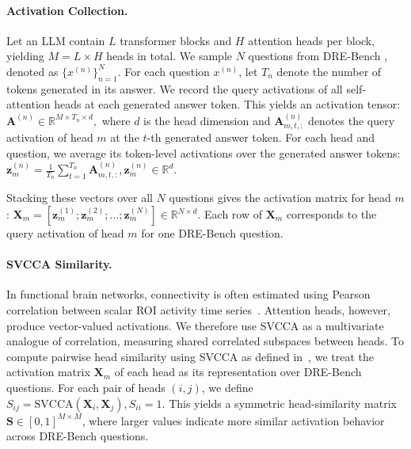 \paragraph{Activation Collection.}

Let an LLM contain $L$ transformer blocks and $H$ attention heads per block, yielding $M=L\times H$ heads in total. We sample $N$ questions from DRE-Bench \cite{yang2025truly}, denoted as $\{x^{(n)}\}_{n=1}^{N}$. For each question $x^{(n)}$, let $T_n$ denote the number of tokens generated in its answer. We record the query activations of all self-attention heads at each generated answer token.
This yields an activation tensor:
$
\mathbf{A}^{(n)} \in \mathbb{R}^{M \times T_n \times d},
$
where $d$ is the head dimension and $\mathbf{A}^{(n)}_{m,t,:}$ denotes the query activation of head $m$ at the $t$-th generated answer token. For each head and question, we average its token-level activations over the generated answer tokens:
$
\mathbf{z}^{(n)}_m =
\frac{1}{T_n}\sum_{t=1}^{T_n}\mathbf{A}^{(n)}_{m,t,:}, \mathbf{z}^{(n)}_m \in \mathbb{R}^{d}.
$

Stacking these vectors over all $N$ questions gives the activation matrix for head $m$:
$
\mathbf{X}_m =
\left[
\mathbf{z}^{(1)}_m;
\mathbf{z}^{(2)}_m;
\dots;
\mathbf{z}^{(N)}_m
\right]
\in \mathbb{R}^{N\times d}.
$
Each row of $\mathbf{X}_m$ corresponds to the query activation of head $m$ for one DRE-Bench question.


\paragraph{SVCCA Similarity.}
In functional brain networks, connectivity is often estimated using Pearson correlation between scalar ROI activity time series~\cite{biswal1995functional, fox2005human}. Attention heads, however, produce vector-valued activations. We therefore use SVCCA as a multivariate analogue of correlation, measuring shared correlated subspaces between heads. To compute pairwise head similarity using SVCCA as defined in~, we treat the activation matrix $\mathbf{X}_m$ of each head as its representation over DRE-Bench questions. For each pair of heads $(i,j)$, we define
$
S_{ij}=\mathrm{SVCCA}(\mathbf{X}_i,\mathbf{X}_j), S_{ii}=1.
$
This yields a symmetric head-similarity matrix $\mathbf{S}\in[0,1]^{M\times M}$, where larger values indicate more similar activation behavior across DRE-Bench questions.


